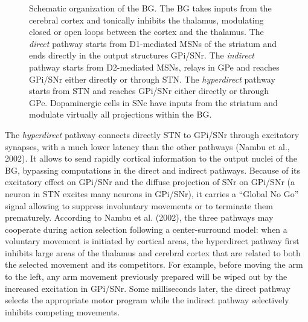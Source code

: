 \documentclass[
  11pt,
  a4paper,
]{scrbook}
\begin{document}
\begin{figure}


\caption{\label{fig-intro:bg_structure}Schematic organization of the BG.
The BG takes inputs from the cerebral cortex and tonically inhibits the
thalamus, modulating closed or open loops between the cortex and the
thalamus. The \emph{direct} pathway starts from D1-mediated MSNs of the
striatum and ends directly in the output structures GPi/SNr. The
\emph{indirect} pathway starts from D2-mediated MSNs, relays in GPe and
reaches GPi/SNr either directly or through STN. The \emph{hyperdirect}
pathway starts from STN and reaches GPi/SNr either directly or through
GPe. Dopaminergic cells in SNc have inputs from the striatum and
modulate virtually all projections within the BG.}

\end{figure}%

The \emph{hyperdirect} pathway connects directly STN to GPi/SNr through
excitatory synapses, with a much lower latency than the other pathways
(Nambu et al., 2002). It allows to send rapidly cortical information to
the output nuclei of the BG, bypassing computations in the direct and
indirect pathways. Because of its excitatory effect on GPi/SNr and the
diffuse projection of SNr on GPi/SNr (a neuron in STN excites many
neurons in GPi/SNr), it carries a ``Global No Go'' signal allowing to
suppress involuntary movements or to terminate them prematurely.
According to Nambu et al. (2002), the three pathways may cooperate
during action selection following a center-surround model: when a
voluntary movement is initiated by cortical areas, the hyperdirect
pathway first inhibits large areas of the thalamus and cerebral cortex
that are related to both the selected movement and its competitors. For
example, before moving the arm to the left, any arm movement previously
prepared will be wiped out by the increased excitation in GPi/SNr. Some
milliseconds later, the direct pathway selects the appropriate motor
program while the indirect pathway selectively inhibits competing
movements.
\end{document}
